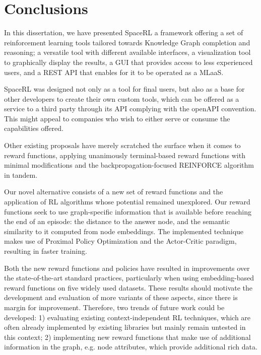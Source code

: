 \chapter{Conclusions}\label{chap:conclusions}


\vspace{1cm}

In this dissertation, we have presented SpaceRL a framework offering a set of reinforcement learning tools tailored towards Knowledge Graph completion and reasoning; a versatile tool with different available interfaces, a visualization tool to graphically display the results, a GUI  that provides access to less experienced users, and a REST API that enables for it to be operated as a MLaaS.

SpaceRL was designed not only as a tool for final users, but also as a base for other developers to create their own custom tools, which can be offered as a service to a third party through its API complying with the openAPI convention. This might appeal to companies who wish to either serve or consume the capabilities offered.

Other existing proposals have merely scratched the surface when it comes to reward functions, applying unanimously terminal-based reward functions with minimal modifications and the backpropagation-focused REINFORCE algorithm in tandem.

Our novel alternative consists of a new set of reward functions and the application of RL algorithms whose potential remained unexplored. Our reward functions seek to use graph-specific information that is available before reaching the end of an episode: the distance to the answer node, and the semantic similarity to it computed from node embeddings. The implemented technique makes use of Proximal Policy Optimization and the Actor-Critic paradigm, resulting in faster training.

Both the new reward functions and policies have resulted in improvements over the state-of-the-art standard practices, particularly when using embedding-based reward functions on five widely used datasets. These results should motivate the development and evaluation of more variants of these aspects, since there is margin for improvement. Therefore, two trends of future work could be developed: 1) evaluating existing context-independent RL techniques, which are often already implemented by existing libraries but mainly remain untested in this context; 2) implementing new reward functions that make use of additional information in the graph, e.g. node attributes, which provide additional rich data.